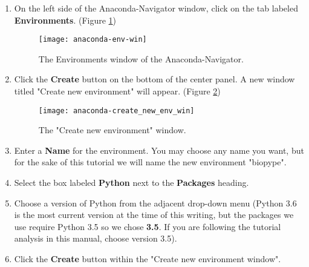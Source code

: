     \begin{enumerate}
        \item {} On the left side of the Anaconda-Navigator window, click on the tab labeled \textbf{Environments}. (Figure \ref{anaconda-env-win}) 
        \begin{figure}
            \texttt{[image: anaconda-env-win]}
            \caption{The Environments window of the Anaconda-Navigator.}
            \label{anaconda-env-win}
        \end{figure}
        \item Click the \textbf{Create} button on the bottom of the center panel. A new window titled "Create new environment" will appear. (Figure \ref{anaconda-create-new-env-win})
        \begin{figure}[h]
            \begin{center}
            \texttt{[image: anaconda-create\_new\_env\_win]}
            \caption{The "Create new environment" window.}
            \label{anaconda-create-new-env-win}
            \end{center}
        \end{figure}
        \item Enter a \textbf{Name} for the environment. You may choose any name you want, but for the sake of this tutorial we will name the new environment "biopype".
        \item Select the box labeled \textbf{Python} next to the \textbf{Packages} heading.
        \item Choose a version of Python from the adjacent drop-down menu (Python 3.6 is the most current version at the time of this writing, but the packages we use require Python 3.5 so we chose \textbf{3.5}. If you are following the tutorial analysis in this manual, choose version 3.5).
        \item Click the \textbf{Create} button within the "Create new environment window".
    \end{enumerate}

